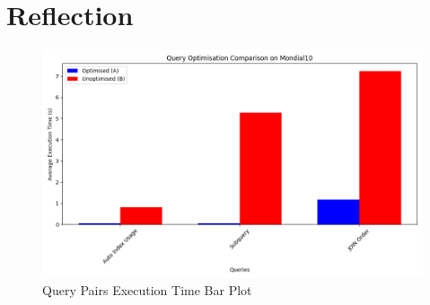 \documentclass[11pt]{article}
\begin{document}
\section{Reflection}

\begin{figure}
    \centering
    \includegraphics[width=0.9\linewidth]{query_execution_times.png}
    \caption{Query Pairs Execution Time Bar Plot}
    \label{fig:plot}
\end{figure}
\end{document}
